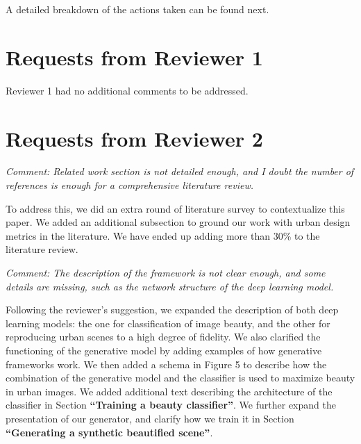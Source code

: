 \documentclass{paper}
\newenvironment{myquote}
{\definecolor{shadecolor}{rgb}{0.9,0.95,1} \begin{shaded*} \sf \em}
{\em\end{shaded*}}
\begin{document}
A detailed breakdown of the actions taken can be found next.

\section*{Requests from Reviewer 1}

\noindent Reviewer 1 had no additional comments to be addressed.

\section*{Requests from Reviewer 2}

\begin{myquote}
\noindent Comment: Related work section is not detailed enough, and I doubt the number of references is enough for a comprehensive literature review.
\end{myquote}

\noindent To address this, we did an extra round of literature survey to  contextualize this paper. We added an additional subsection to ground our work with urban design metrics in the literature. We have ended up adding more than 30\% to the literature review. 


\begin{myquote}
\noindent Comment: The description of the framework is not clear enough, and some details are missing, such as the network structure of the deep learning model.
\end{myquote}

\noindent Following the reviewer's suggestion, we expanded the description of both deep learning models: the one for classification of image beauty, and the other for reproducing urban scenes to a high degree of fidelity. We also clarified the functioning of the generative model by adding examples of how generative frameworks work. We then added a schema in Figure 5 to describe how the combination of the generative model and the classifier is used to maximize beauty in urban images. We added additional text describing the architecture of the classifier in Section \textbf{``Training a beauty classifier''}. We further expand the presentation of our generator, and clarify how we train it in Section \textbf{``Generating a synthetic beautified scene''}.
\end{document}
